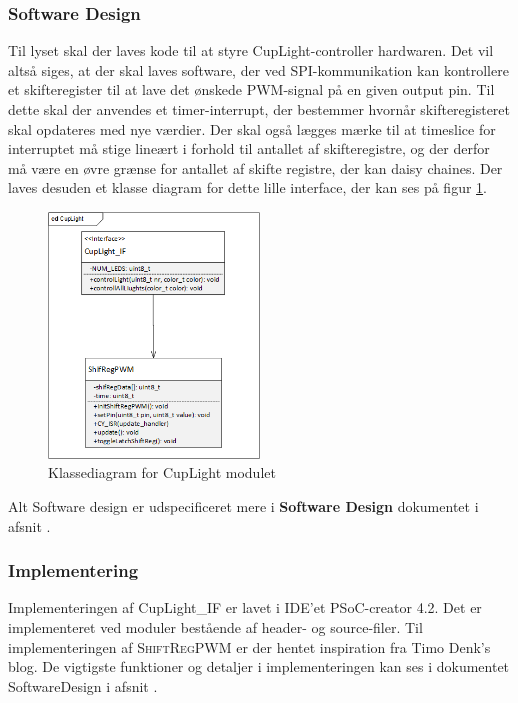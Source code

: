 \documentclass[Rapport/Rapport_main.tex]{subfiles}
\begin{document}
\subsubsection{Software Design}
Til lyset skal der laves kode til at styre CupLight-controller hardwaren. Det vil altså siges, at der skal laves software, der ved SPI-kommunikation kan kontrollere et skifteregister til at lave det ønskede PWM-signal på en given output pin. Til dette skal der anvendes et timer-interrupt, der bestemmer hvornår skifteregisteret skal opdateres med nye værdier. Der skal også lægges mærke til at timeslice for interruptet må stige lineært i forhold til antallet af skifteregistre, og der derfor må være en øvre grænse for antallet af skifte registre, der kan daisy chaines. Der laves desuden et klasse diagram for dette lille interface, der kan ses på figur \ref{fig:rap_cd_cuplight}.
\begin{figure}[H]
    \centering
    \includegraphics[width=0.5\textwidth]{Softwaredesign/CupLight_IF/graphics/CD_CupLight.png}
    \caption{Klassediagram for CupLight modulet}
    \label{fig:rap_cd_cuplight}
\end{figure}
Alt Software design er udspecificeret mere i \textbf{Software Design} dokumentet i afsnit .
\subsubsection{Implementering}
Implementeringen af CupLight\_IF er lavet i IDE'et PSoC-creator 4.2. Det er implementeret ved moduler bestående af header- og source-filer. Til implementeringen af \textsc{ShiftRegPWM} er der hentet inspiration fra Timo Denk's blog\cite{shiftregpwm}. De vigtigste funktioner og detaljer i implementeringen kan ses i dokumentet SoftwareDesign i afsnit .
\end{document}
